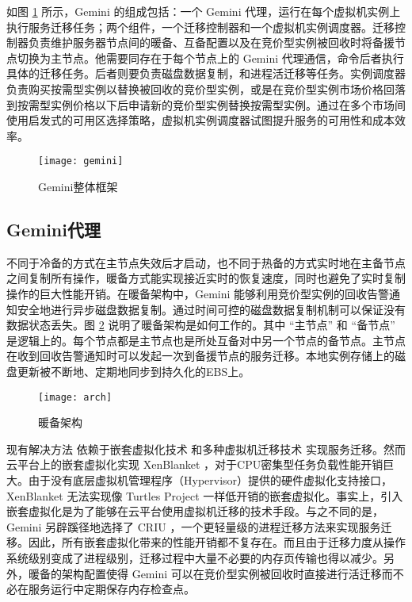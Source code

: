 如图 \ref{figure:gemini} 所示，Gemini 的组成包括：一个 Gemini 代理，运行在每个虚拟机实例上执行服务迁移任务；两个组件，一个迁移控制器和一个虚拟机实例调度器。迁移控制器负责维护服务器节点间的暖备、互备配置以及在竞价型实例被回收时将备援节点切换为主节点。他需要同存在于每个节点上的 Gemini 代理通信，命令后者执行具体的迁移任务。后者则要负责磁盘数据复制，和进程活迁移等任务。实例调度器负责购买按需型实例以替换被回收的竞价型实例，或是在竞价型实例市场价格回落到按需型实例价格以下后申请新的竞价型实例替换按需型实例。通过在多个市场间使用启发式的可用区选择策略，虚拟机实例调度器试图提升服务的可用性和成本效率。
\begin{figure}
  \centering
  \texttt{[image: gemini]}
  \caption{Gemini整体框架}
  \label{figure:gemini}
\end{figure}

\subsection{Gemini代理}
不同于冷备的方式在主节点失效后才启动，也不同于热备的方式实时地在主备节点之间复制所有操作，暖备方式能实现接近实时的恢复速度，同时也避免了实时复制操作的巨大性能开销。在暖备架构中，Gemini 能够利用竞价型实例的回收告警通知安全地进行异步磁盘数据复制。通过时间可控的磁盘数据复制机制可以保证没有数据状态丢失。图 \ref{figure:arch} 说明了暖备架构是如何工作的。其中 ``主节点'' 和 ``备节点'' 是逻辑上的。每个节点都是主节点也是所处互备对中另一个节点的备节点。主节点在收到回收告警通知时可以发起一次到备援节点的服务迁移。本地实例存储上的磁盘更新被不断地、定期地同步到持久化的EBS上。
\begin{figure}
  \centering
  \texttt{[image: arch]}
  \caption{暖备架构}
  \label{figure:arch}
\end{figure}

现有解决方法 \cite{He:2015:CCH:2749246.2749275} 依赖于嵌套虚拟化技术 \cite{Williams:2012:XVO:2168836.2168849} 和多种虚拟机迁移技术 \cite{Singh:2013:YEG:2482626.2482642, Hines:2009:PBL:1508293.1508301} 实现服务迁移。然而云平台上的嵌套虚拟化实现 XenBlanket \cite{Williams:2012:XVO:2168836.2168849}，对于CPU密集型任务负载性能开销巨大。由于没有底层虚拟机管理程序（Hypervisor）提供的硬件虚拟化支持接口，XenBlanket 无法实现像 Turtles Project \cite{Ben-Yehuda:2010:TPD:1924943.1924973} 一样低开销的嵌套虚拟化。事实上，引入嵌套虚拟化是为了能够在云平台使用虚拟机迁移的技术手段。与之不同的是，Gemini 另辟蹊径地选择了 CRIU \cite{CRIU:2016}，一个更轻量级的进程迁移方法来实现服务迁移。因此，所有嵌套虚拟化带来的性能开销都不复存在。而且由于迁移力度从操作系统级别变成了进程级别，迁移过程中大量不必要的内存页传输也得以减少。另外，暖备的架构配置使得 Gemini 可以在竞价型实例被回收时直接进行活迁移而不必在服务运行中定期保存内存检查点。

